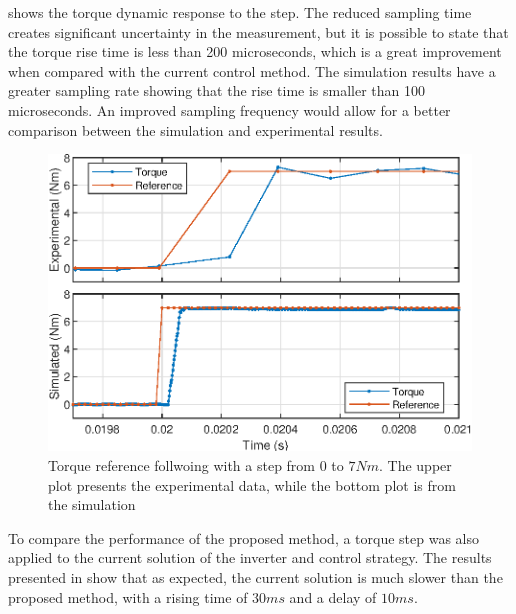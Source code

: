\documentclass[9pt,conference]{IEEEtran}
\begin{document}
 shows the torque dynamic response to the step. The reduced sampling time creates significant uncertainty in the measurement, but it is possible to state that the torque rise time is less than 200 microseconds, which is a great improvement when compared with the current control method. The simulation results have a greater sampling rate showing that the rise time is smaller than 100 microseconds. An improved sampling frequency would allow for a better comparison between the simulation and experimental results.

\begin{figure}[!htb]
	\centering
	\includegraphics[width=1\linewidth]{Figures/Tq_step.eps}
	\caption[Torque reference follwoing with a step from $0$ to $7Nm$.]{Torque reference follwoing with a step from $0$ to $7Nm$. The upper plot presents the experimental data, while the bottom plot is from the simulation}
	\label{fig:tq_step_response_time} %
\end{figure}

To compare the performance of the proposed method, a torque step was also applied to the current solution of the inverter and control strategy. The results presented in  show that as expected, the current solution is much slower than the proposed method, with a rising time of $30ms$ and a delay of $10ms$. 
\end{document}
